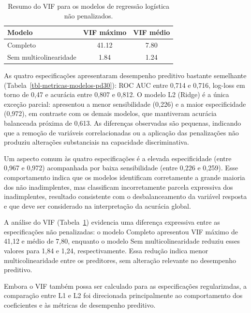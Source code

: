 \documentclass[
  brazilian,
  12pt,
  letterpaper,
  DIV=11,
  numbers=noendperiod]{scrartcl}
\begin{document}
{

\begin{longtable}[]{@{}lcc@{}}

\caption{\label{tbl-vif-modelos-pd30}Resumo do VIF para os modelos de
regressão logística não penalizados.}

\tabularnewline

\toprule\noalign{}
Modelo & VIF máximo & VIF médio \\
\midrule\noalign{}
\endhead
\bottomrule\noalign{}
\endlastfoot
Completo & 41.12 & 7.80 \\
Sem multicolinearidade & 1.84 & 1.24 \\

\end{longtable}

}

As quatro especificações apresentaram desempenho preditivo bastante
semelhante (Tabela~\ref{tbl-metricas-modelos-pd30}): ROC AUC entre 0,714
e 0,716, log-loss em torno de 0,47 e acurácia entre 0,807 e 0,812. O
modelo L2 (Ridge) é a única exceção parcial: apresentou a menor
sensibilidade (0,226) e a maior especificidade (0,972), em contraste com
os demais modelos, que mantiveram acurácia balanceada próxima de 0,613.
As diferenças observadas são pequenas, indicando que a remoção de
variáveis correlacionadas ou a aplicação das penalizações não produziu
alterações substanciais na capacidade discriminativa.

Um aspecto comum às quatro especificações é a elevada especificidade
(entre 0,967 e 0,972) acompanhada por baixa sensibilidade (entre 0,226 e
0,259). Esse comportamento indica que os modelos identificam
corretamente a grande maioria dos não inadimplentes, mas classificam
incorretamente parcela expressiva dos inadimplentes, resultado
consistente com o desbalanceamento da variável resposta e que deve ser
considerado na interpretação da acurácia global.

A análise do VIF (Tabela~\ref{tbl-vif-modelos-pd30}) evidencia uma
diferença expressiva entre as especificações não penalizadas: o modelo
Completo apresentou VIF máximo de 41,12 e médio de 7,80, enquanto o
modelo Sem multicolinearidade reduziu esses valores para 1,84 e 1,24,
respectivamente. Essa redução indica menor multicolinearidade entre os
preditores, sem alteração relevante no desempenho preditivo.

Embora o VIF também possa ser calculado para as especificações
regularizadas, a comparação entre L1 e L2 foi direcionada principalmente
ao comportamento dos coeficientes e às métricas de desempenho preditivo.
\end{document}
